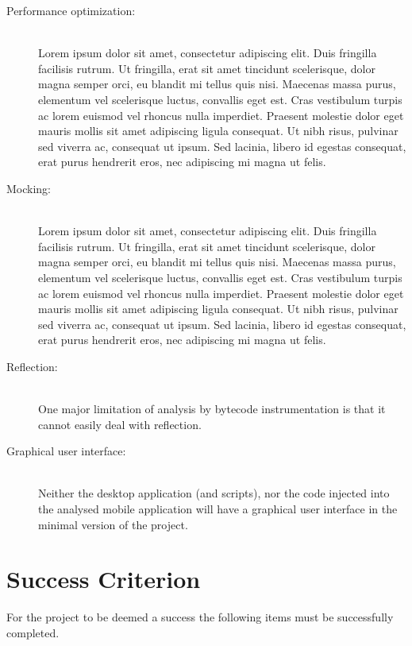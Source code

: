 \documentclass[12pt]{article}
\begin{document}
\begin{description}
\item [Performance optimization:] \ \\
Lorem ipsum dolor sit amet, consectetur adipiscing elit. Duis fringilla facilisis rutrum. Ut fringilla, erat sit amet tincidunt scelerisque, dolor magna semper orci, eu blandit mi tellus quis nisi. Maecenas massa purus, elementum vel scelerisque luctus, convallis eget est. Cras vestibulum turpis ac lorem euismod vel rhoncus nulla imperdiet. Praesent molestie dolor eget mauris mollis sit amet adipiscing ligula consequat. Ut nibh risus, pulvinar sed viverra ac, consequat ut ipsum. Sed lacinia, libero id egestas consequat, erat purus hendrerit eros, nec adipiscing mi magna ut felis.

\item [Mocking:] \ \\
Lorem ipsum dolor sit amet, consectetur adipiscing elit. Duis fringilla facilisis rutrum. Ut fringilla, erat sit amet tincidunt scelerisque, dolor magna semper orci, eu blandit mi tellus quis nisi. Maecenas massa purus, elementum vel scelerisque luctus, convallis eget est. Cras vestibulum turpis ac lorem euismod vel rhoncus nulla imperdiet. Praesent molestie dolor eget mauris mollis sit amet adipiscing ligula consequat. Ut nibh risus, pulvinar sed viverra ac, consequat ut ipsum. Sed lacinia, libero id egestas consequat, erat purus hendrerit eros, nec adipiscing mi magna ut felis.
 
\item [Reflection:] \ \\
One major limitation of analysis by bytecode instrumentation is that it 
cannot easily deal with reflection. 

\item [Graphical user interface:] \ \\
Neither the desktop application (and scripts), nor the code injected 
into the analysed mobile application will have a graphical user interface
in the minimal version of the project. 


\end{description}





\section*{Success Criterion}

For the project to be deemed a success the following items must be
successfully completed.
\end{document}
